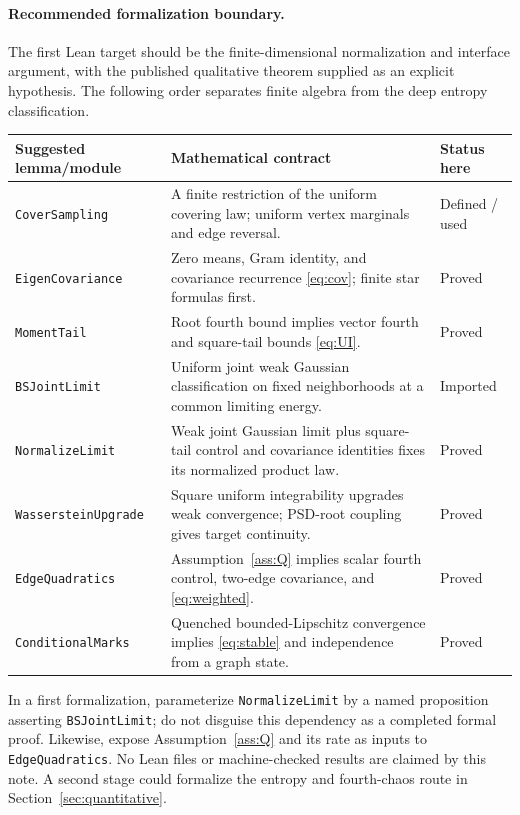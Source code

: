 \documentclass[11pt]{article}
\numberwithin{equation}{section}
\theoremstyle{definition}
\theoremstyle{remark}
\begin{document}
\paragraph{Recommended formalization boundary.}
The first Lean target should be the finite-dimensional normalization
and interface argument, with the published qualitative theorem supplied
as an explicit hypothesis. The following order separates finite
algebra from the deep entropy classification.
\begin{center}
\small
\begin{tabular}{>{\raggedright\arraybackslash}p{.28\linewidth}>{\raggedright\arraybackslash}p{.46\linewidth}>{\raggedright\arraybackslash}p{.14\linewidth}}
\toprule
Suggested lemma/module & Mathematical contract & Status here\\
\midrule
\texttt{CoverSampling} & A finite restriction of the uniform covering
law; uniform vertex marginals and edge reversal. & Defined / used\\[3pt]
\texttt{EigenCovariance} & Zero means, Gram identity, and covariance
recurrence \eqref{eq:cov}; finite star formulas first. & Proved\\[3pt]
\texttt{MomentTail} & Root fourth bound implies vector fourth and
square-tail bounds \eqref{eq:UI}. & Proved\\[3pt]
\texttt{BSJointLimit} & Uniform joint weak Gaussian classification on
fixed neighborhoods at a common limiting energy. & Imported \cite{BS}\\[3pt]
\texttt{NormalizeLimit} & Weak joint Gaussian limit plus square-tail
control and covariance identities fixes its normalized product law.
& Proved\\[3pt]
\texttt{WassersteinUpgrade} & Square uniform integrability upgrades
weak convergence; PSD-root coupling gives target continuity. & Proved\\[3pt]
\texttt{EdgeQuadratics} & Assumption~\ref{ass:Q} implies scalar fourth
control, two-edge covariance, and \eqref{eq:weighted}. & Proved\\[3pt]
\texttt{ConditionalMarks} & Quenched bounded-Lipschitz convergence
implies \eqref{eq:stable} and independence from a graph state.
& Proved\\
\bottomrule
\end{tabular}
\end{center}

In a first formalization, parameterize \texttt{NormalizeLimit} by a
named proposition asserting \texttt{BSJointLimit}; do not disguise this
dependency as a completed formal proof. Likewise, expose
Assumption~\ref{ass:Q} and its rate as inputs to
\texttt{EdgeQuadratics}. No Lean files or machine-checked results are
claimed by this note. A second stage could formalize the entropy and
fourth-chaos route in Section~\ref{sec:quantitative}.
\end{document}
